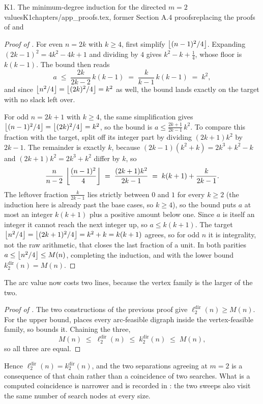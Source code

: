 \begin{offcut}{K1. The minimum-degree induction for the directed $m=2$ values}{K1}{chapters/app\_proofs.tex, former Section A.4 proofs}{replacing the proofs of  and }
\begin{proof}[Proof of \aimedal]
For even $n = 2k$ with $k \ge 4$, first simplify $\left\lfloor (n-1)^2/4 \right\rfloor$. Expanding $(2k-1)^2 = 4k^2 - 4k + 1$ and dividing by $4$ gives $k^2 - k + \tfrac14$, whose floor is $k(k-1)$. The bound then reads
\[
a \;\le\; \frac{2k}{2k-2}\,k(k-1) \;=\; \frac{k}{k-1}\,k(k-1) \;=\; k^2,
\]
and since $\left\lfloor n^2/4 \right\rfloor = \left\lfloor (2k)^2/4 \right\rfloor = k^2$ as well, the bound lands exactly on the target with no slack left over.

For odd $n = 2k+1$ with $k \ge 4$, the same simplification gives $\left\lfloor (n-1)^2/4 \right\rfloor = \left\lfloor (2k)^2/4 \right\rfloor = k^2$, so the bound is $a \le \frac{2k+1}{2k-1}\,k^2$. To compare this fraction with the target, split off its integer part by dividing $(2k+1)k^2$ by $2k-1$. The remainder is exactly $k$, because $(2k-1)(k^2+k) = 2k^3 + k^2 - k$ and $(2k+1)k^2 = 2k^3 + k^2$ differ by $k$, so
\[
\frac{n}{n-2}\,\left\lfloor \frac{(n-1)^2}{4} \right\rfloor \;=\; \frac{(2k+1)k^2}{2k-1} \;=\; k(k+1) + \frac{k}{2k-1}.
\]
The leftover fraction $\frac{k}{2k-1}$ lies strictly between $0$ and $1$ for every $k \ge 2$ (the induction here is already past the base cases, so $k \ge 4$), so the bound puts $a$ at most an integer $k(k+1)$ plus a positive amount below one. Since $a$ is itself an integer it cannot reach the next integer up, so $a \le k(k+1)$. The target $\left\lfloor n^2/4 \right\rfloor = \left\lfloor (2k+1)^2/4 \right\rfloor = k^2 + k = k(k+1)$ agrees, so for odd $n$ it is integrality, not the raw arithmetic, that closes the last fraction of a unit. In both parities $a \le \left\lfloor n^2/4 \right\rfloor \le M(n)$, completing the induction, and with the lower bound $k_2^{\mathrm{dir}}(n) = M(n)$.
\end{proof}

The arc value now costs two lines, because the vertex family is the larger of the two.

\begin{proof}[Proof of \aimedal]
The two constructions of the previous proof give $\ell_2^{\mathrm{dir}}(n) \ge M(n)$. For the upper bound,  places every arc-feasible digraph inside the vertex-feasible family, so  bounds it. Chaining the three,
\[
    M(n) \;\le\; \ell_2^{\mathrm{dir}}(n) \;\le\; k_2^{\mathrm{dir}}(n) \;\le\; M(n),
\]
so all three are equal.
\end{proof}

Hence $\ell_2^{\mathrm{dir}}(n) = k_2^{\mathrm{dir}}(n)$, and the two separations agreeing at $m = 2$ is a consequence of that chain rather than a coincidence of two searches. What is a computed coincidence is narrower and is recorded in : the two sweeps also visit the same number of search nodes at every size.


\end{offcut}
